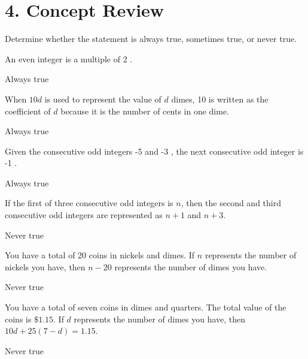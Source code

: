 \documentclass{ximera}
\begin{document}
\section*{4. Concept Review}
Determine whether the statement is always true, sometimes true, or never true.

\begin{question}
An even integer is a multiple of 2 .
\begin{solution}
Always true
\end{solution}
\end{question}

\begin{question}
When $10 d$ is used to represent the value of $d$ dimes, 10 is written as the coefficient of $d$ because it is the number of cents in one dime.
\begin{solution}
Always true
\end{solution}
\end{question}

\begin{question}
Given the consecutive odd integers -5 and -3 , the next consecutive odd integer is -1 .
\begin{solution}
Always true
\end{solution}
\end{question}

\begin{question}
If the first of three consecutive odd integers is $n$, then the second and third consecutive odd integers are represented as $n+1$ and $n+3$.
\begin{solution}
Never true
\end{solution}
\end{question}

\begin{question}
You have a total of 20 coins in nickels and dimes. If $n$ represents the number of nickels you have, then $n-20$ represents the number of dimes you have.
\begin{solution}
Never true
\end{solution}
\end{question}

\begin{question}
You have a total of seven coins in dimes and quarters. The total value of the coins is $\$ 1.15$. If $d$ represents the number of dimes you have, then $10 d+25(7-d)=1.15$.
\begin{solution}
Never true
\end{solution}
\end{question}
\end{document}
